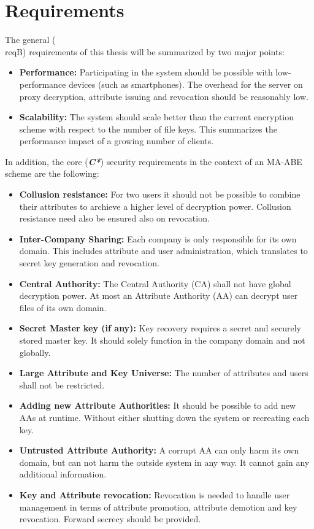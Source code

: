 \section{Requirements}
\label{sec:requirements}
The general (\\req{B}) requirements of this thesis will be summarized by two major points: 

\begin{itemize}
	\item[\req{B1}] \textbf{Performance:} Participating in the system should be possible with low-performance devices (such as smartphones). The overhead for the server on proxy decryption, attribute issuing and revocation should be reasonably low.  
	\item[\req{B2}] \textbf{Scalability:} The system should scale better than the current encryption scheme with respect to the number of file keys. This summarizes the performance impact of a growing number of clients.
\end{itemize}

In addition, the core (\textbf{\textit{C*}}) security requirements in the context of an \ac{MA-ABE} scheme are the following:
\begin{itemize}
\item[\req{C1}] \textbf{Collusion resistance:} For two users it should not be possible to combine their attributes to archieve a higher level of decryption power. Collusion resistance need also be ensured also on revocation. 
\item[\req{C2}] \textbf{Inter-Company Sharing:} Each company is only responsible for its own domain. This includes attribute and user administration, which translates to secret key generation and revocation. 
\item[\req{C3}] \textbf{Central Authority:} The Central Authority (\ac{CA}) shall not have global decryption power. At most an Attribute Authority (\ac{AA}) can decrypt user files of its own domain.  
\item[\req{C4}] \textbf{Secret Master key (if any):} Key recovery requires a secret and securely stored master key. It should solely function in the company domain and not globally. 
\item[\req{C5}] \textbf{Large Attribute and Key Universe:} The number of attributes and users shall not be restricted.
\item[\req{C6}] \textbf{Adding new Attribute Authorities:} It should be possible to add new AAs at runtime. Without either shutting down the system or recreating each key.
\item[\req{C7}] \textbf{Untrusted Attribute Authority:} A corrupt AA can only harm its own domain, but can not harm the outside system in any way. It cannot gain any additional information.
\item[\req{C8}] \textbf{Key and Attribute revocation:} Revocation is needed to handle user management in terms of attribute promotion, attribute demotion and key revocation. Forward secrecy should be provided.
\end{itemize}

